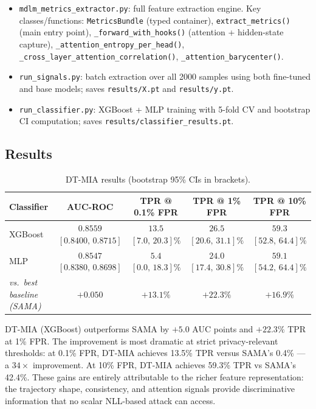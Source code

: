 \documentclass[11pt,a4paper]{article}
\begin{document}
\begin{itemize}
  \item \texttt{mdlm\_metrics\_extractor.py}: full feature extraction engine.
        Key classes/functions: \texttt{MetricsBundle} (typed container),
        \texttt{extract\_metrics()} (main entry point), \texttt{\_forward\_with\_hooks()}
        (attention + hidden-state capture), \texttt{\_attention\_entropy\_per\_head()},
        \texttt{\_cross\_layer\_attention\_correlation()}, \texttt{\_attention\_barycenter()}.
  \item \texttt{run\_signals.py}: batch extraction over all 2000 samples using
        both fine-tuned and base models; saves \texttt{results/X.pt} and
        \texttt{results/y.pt}.
  \item \texttt{run\_classifier.py}: XGBoost + MLP training with 5-fold CV and
        bootstrap CI computation; saves \texttt{results/classifier\_results.pt}.
\end{itemize}

\subsection{Results}

\begin{table}[H]
\centering
\caption{DT-MIA results (bootstrap 95\% CIs in brackets).}
\label{tab:dtmia}
\begin{tabular}{lcccc}
\toprule
Classifier & AUC-ROC & TPR @ 0.1\% FPR & TPR @ 1\% FPR & TPR @ 10\% FPR \\
\midrule
XGBoost
  & $0.8559$\;$[0.8400,\,0.8715]$
  & $13.5$\;$[7.0,\,20.3]\%$
  & $26.5$\;$[20.6,\,31.1]\%$
  & $59.3$\;$[52.8,\,64.4]\%$ \\
MLP
  & $0.8547$\;$[0.8380,\,0.8698]$
  & $5.4$\;$[0.0,\,18.3]\%$
  & $24.0$\;$[17.4,\,30.8]\%$
  & $59.1$\;$[54.2,\,64.4]\%$ \\
\midrule
\textit{vs.\ best baseline (SAMA)}
  & $+0.050$
  & $+13.1\%$
  & $+22.3\%$
  & $+16.9\%$ \\
\bottomrule
\end{tabular}
\end{table}

DT-MIA (XGBoost) outperforms SAMA by $+5.0$ AUC points and $+22.3\%$ TPR at
1\% FPR.  The improvement is most dramatic at strict privacy-relevant thresholds:
at 0.1\% FPR, DT-MIA achieves 13.5\% TPR versus SAMA's 0.4\% — a $34\times$
improvement.  At 10\% FPR, DT-MIA achieves 59.3\% TPR vs SAMA's 42.4\%.
These gains are entirely attributable to the richer feature representation:
the trajectory shape, consistency, and attention signals provide discriminative
information that no scalar NLL-based attack can access.
\end{document}
